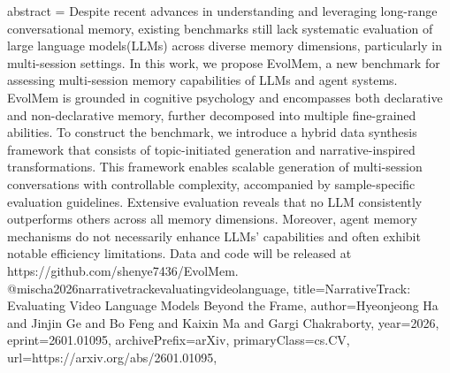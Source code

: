 {      abstract = {Despite recent advances in understanding and leveraging long-range conversational memory, existing benchmarks still lack systematic evaluation of large language models(LLMs) across diverse memory dimensions, particularly in multi-session settings. In this work, we propose EvolMem, a new benchmark for assessing multi-session memory capabilities of LLMs and agent systems. EvolMem is grounded in cognitive psychology and encompasses both declarative and non-declarative memory, further decomposed into multiple fine-grained abilities. To construct the benchmark, we introduce a hybrid data synthesis framework that consists of topic-initiated generation and narrative-inspired transformations. This framework enables scalable generation of multi-session conversations with controllable complexity, accompanied by sample-specific evaluation guidelines. Extensive evaluation reveals that no LLM consistently outperforms others across all memory dimensions. Moreover, agent memory mechanisms do not necessarily enhance LLMs' capabilities and often exhibit notable efficiency limitations. Data and code will be released at https://github.com/shenye7436/EvolMem.}
}@misc{ha2026narrativetrackevaluatingvideolanguage,
      title={NarrativeTrack: Evaluating Video Language Models Beyond the Frame}, 
      author={Hyeonjeong Ha and Jinjin Ge and Bo Feng and Kaixin Ma and Gargi Chakraborty},
      year={2026},
      eprint={2601.01095},
      archivePrefix={arXiv},
      primaryClass={cs.CV},
      url={https://arxiv.org/abs/2601.01095},
}
